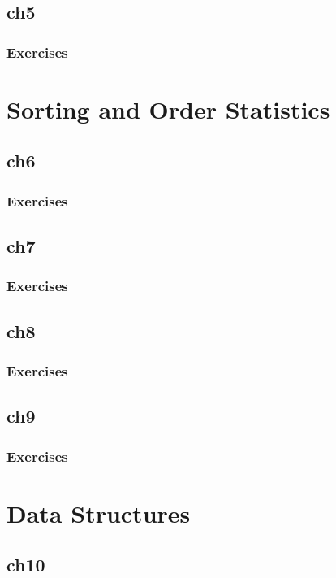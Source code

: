 \documentclass[a4paper, 11pt, fleqn]{report}
\begin{document}
        \chapter{ch5}
            \section*{Exercises}
    \part{Sorting and Order Statistics}
        \chapter{ch6}
            \section*{Exercises}
        \chapter{ch7}
            \section*{Exercises}
        \chapter{ch8}
            \section*{Exercises}
        \chapter{ch9}
            \section*{Exercises}
    \part{Data Structures}
        \chapter{ch10}
\end{document}
